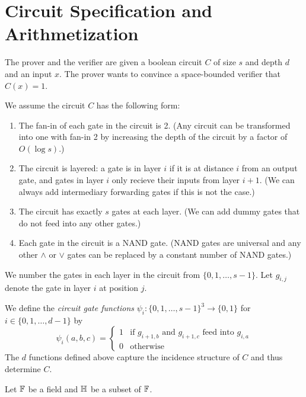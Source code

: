 \section{Circuit Specification and Arithmetization}

The prover and the verifier are given a boolean circuit $C$ of size $s$ and
depth $d$ and an input $x$. The prover wants to convince a space-bounded
verifier that $C(x) = 1$.

We assume the circuit $C$ has the following form:
\begin{enumerate}
  \item The fan-in of each gate in the circuit is 2. (Any circuit can be
    transformed into one with fan-in 2 by increasing the depth of the circuit
    by a factor of $O(\log s)$.)
  \item The circuit is layered: a gate is in layer $i$ if it is at distance $i$
    from an output gate, and gates in layer $i$ only recieve their inputs from
    layer $i + 1$. (We can always add intermediary forwarding gates if this is
    not the case.)
  \item The circuit has exactly $s$ gates at each layer. (We can add dummy
    gates that do not feed into any other gates.)
  \item Each gate in the circuit is a NAND gate. (NAND gates are universal and
    any other $\wedge$ or $\vee$ gates can be replaced by a constant number of
    NAND gates.)
\end{enumerate}

We number the gates in each layer in the circuit from $\{0,1,\ldots, s-1\}$.
Let $g_{i,j}$ denote the gate in layer $i$ at position $j$.

\begin{definition}\label{def:psis}
  We define the \emph{circuit gate functions} $\psi_i:\{0,1,\ldots, s-1\}^3 \to
  \{0,1\}$ for $i \in \{0, 1, \ldots, d-1\}$ by
	\[
    \psi_i(a,b,c) = \begin{cases}
      1 &\text{if $g_{i+1,b}$ and $g_{i+1,c}$ feed into $g_{i,a}$}\\
      0 &\text{otherwise}
    \end{cases}
	\]
  The $d$ functions defined above capture the incidence structure of $C$ and
  thus determine $C$.
\end{definition}

Let $\mathbb{F}$ be a field and $\mathbb{H}$ be a subset of $\mathbb{F}$.


